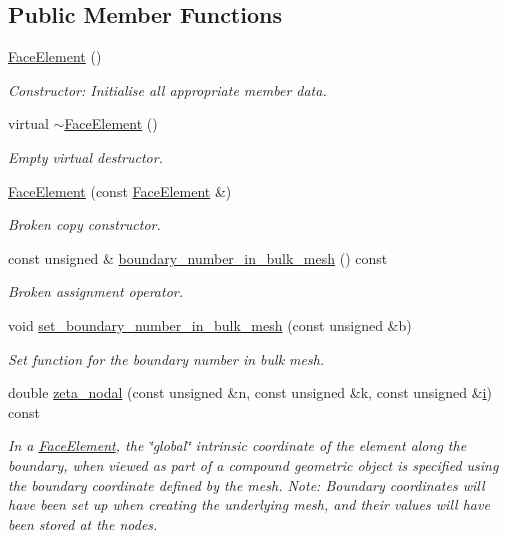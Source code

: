 \subsection*{Public Member Functions}
\begin{DoxyCompactItemize}
\item 
\hyperlink{classoomph_1_1FaceElement_a63f236503b58841500498b98d4fb9721}{Face\+Element} ()
\begin{DoxyCompactList}\small\item\em Constructor\+: Initialise all appropriate member data. \end{DoxyCompactList}\item 
virtual \hyperlink{classoomph_1_1FaceElement_af1eb8c85722a8bdb196f94758dc3c630}{$\sim$\+Face\+Element} ()
\begin{DoxyCompactList}\small\item\em Empty virtual destructor. \end{DoxyCompactList}\item 
\hyperlink{classoomph_1_1FaceElement_a21acf2a56f732a3378674f74525effbf}{Face\+Element} (const \hyperlink{classoomph_1_1FaceElement}{Face\+Element} \&)
\begin{DoxyCompactList}\small\item\em Broken copy constructor. \end{DoxyCompactList}\item 
const unsigned \& \hyperlink{classoomph_1_1FaceElement_a7658b23bf2cf041883f51b827eab9059}{boundary\+\_\+number\+\_\+in\+\_\+bulk\+\_\+mesh} () const
\begin{DoxyCompactList}\small\item\em Broken assignment operator. \end{DoxyCompactList}\item 
void \hyperlink{classoomph_1_1FaceElement_aaaa03a7db357facfbcfc480d8e0db404}{set\+\_\+boundary\+\_\+number\+\_\+in\+\_\+bulk\+\_\+mesh} (const unsigned \&b)
\begin{DoxyCompactList}\small\item\em Set function for the boundary number in bulk mesh. \end{DoxyCompactList}\item 
double \hyperlink{classoomph_1_1FaceElement_a58c9f93705c7741f76c8487d152e68a6}{zeta\+\_\+nodal} (const unsigned \&n, const unsigned \&k, const unsigned \&\hyperlink{cfortran_8h_adb50e893b86b3e55e751a42eab3cba82}{i}) const
\begin{DoxyCompactList}\small\item\em In a \hyperlink{classoomph_1_1FaceElement}{Face\+Element}, the \char`\"{}global\char`\"{} intrinsic coordinate of the element along the boundary, when viewed as part of a compound geometric object is specified using the boundary coordinate defined by the mesh. Note\+: Boundary coordinates will have been set up when creating the underlying mesh, and their values will have been stored at the nodes. \end{DoxyCompactList}\item 

\end{DoxyCompactItemize}
